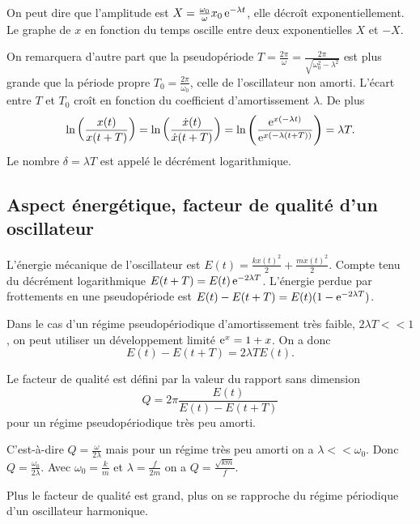 On peut dire que l'amplitude est $X = \frac{\omega_0}{\omega}x_0 \operatorname{e}^{-\lambda t}$, elle décroît exponentiellement. Le graphe de $x$ en fonction du temps oscille entre deux exponentielles $X$ et $-X$.

On remarquera d'autre part que la pseudopériode $T = \frac{2\pi}{\omega} = \frac{2\pi}{\sqrt{\omega_0^2-\lambda^2}}$ est plus grande que la période propre $T_0 = \frac{2\pi}{\omega_0}$, celle de l'oscillateur non amorti. L'écart entre $T$ et $T_0$ croît en fonction du coefficient d'amortissement $\lambda$. De plus
\begin{equation}
  \ln\left(\frac{x(t)}{x(t+T)}\right) = \ln\left(\frac{\dot x(t)}{\dot x(t+T)}\right) = \ln\left(\frac{\operatorname{e}^{x(-\lambda t)}}{\operatorname{e}^{x(-\lambda (t+T))}}\right) = \lambda T.
\end{equation}
Le nombre $\delta = \lambda T$ est appelé le décrément logarithmique.

\subsection{Aspect énergétique, facteur de qualité d'un oscillateur}
\label{chap5-subsec:aspecténergétique}

L'énergie mécanique de l'oscillateur est $E(t) = \frac{k x(t)^2}{2} + \frac{m \dot x(t)^2}{2}$. Compte tenu du décrément logarithmique $E(t+T) = E(t) \operatorname{e}^{-2\lambda T}$. L'énergie perdue par frottements en une pseudopériode est $E(t)-E(t+T) = E(t)(1-\operatorname{e}^{-2\lambda T})$.

Dans le cas d'un régime pseudopériodique d'amortissement très faible, $2\lambda T << 1$, on peut utiliser un développement limité $\operatorname{e}^x = 1+x$. On a donc
\begin{equation}
  E(t)-E(t+T) = 2\lambda T E(t).
\end{equation}
\begin{defdef}
  Le facteur de qualité est défini par la valeur du rapport sans dimension
  \begin{equation}
    Q = 2\pi \frac{E(t)}{E(t)-E(t+T)}
  \end{equation}
  pour un régime pseudopériodique très peu amorti.
\end{defdef}

C'est-à-dire $Q = \frac{\omega}{2\lambda}$ mais pour un régime très peu amorti on a $\lambda << \omega_0$. Donc $Q=\frac{\omega_0}{2\lambda}$. Avec $\omega_0=\frac{k}{m}$ et $\lambda =\frac{f}{2m}$ on a $Q=\frac{\sqrt{km}}{f}$.

Plus le facteur de qualité est grand, plus on se rapproche du régime périodique d'un oscillateur harmonique. 

